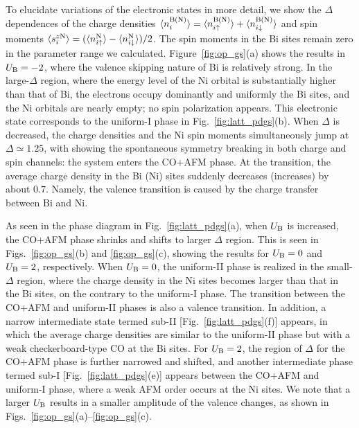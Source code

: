 \documentclass[aps,twocolumn,prl,showpacs,preprintnumbers,amsmath,amssymb]{revtex4}
\begin{document}
To elucidate variations of the electronic states in more detail, we show the $\Delta$ dependences of the charge densities $\langle n^{\rm B(N)}_{i} \rangle = \langle n^{\rm B(N)}_{i \uparrow} \rangle +  \langle n^{\rm B(N)}_{i \downarrow} \rangle$ and spin moments $\langle s_{i}^{z {\rm N}} \rangle = (\langle n^{\rm N}_{i \uparrow} \rangle - \langle n^{\rm N}_{i \downarrow} \rangle)/2$. 
The spin moments in the Bi sites remain zero in the parameter range we calculated. 
Figure~\ref{fig:op_gs}(a) shows the results in $U_{\rm B} = -2$, where the valence skipping nature of Bi is relatively strong. 
In the large-$\Delta$ region, where the energy level of the Ni orbital is substantially higher than that of Bi, 
the electrons occupy dominantly and uniformly the Bi sites, and the Ni orbitals are nearly empty; no spin polarization appears. 
This electronic state corresponds to the uniform-I phase in Fig.~\ref{fig:latt_pdgs}(b). 
When $\Delta$ is decreased, the charge densities and the Ni spin moments simultaneously jump at $\Delta \simeq 1.25$, with showing the spontaneous symmetry breaking in both charge and spin channels: the system enters the CO+AFM phase. 
At the transition, the average charge density in the Bi (Ni) sites suddenly decreases (increases) by about $0.7$. 
Namely, the valence transition is caused by the charge transfer between Bi and Ni. 

As seen in the phase diagram in Fig.~\ref{fig:latt_pdgs}(a), when $U_{\rm B}$ is increased, the CO+AFM phase shrinks and shifts to larger $\Delta$ region. 
This is seen in Figs.~\ref{fig:op_gs}(b) and \ref{fig:op_gs}(c), showing the results for $U_{\rm B} = 0$ and $U_{\rm B} = 2$, respectively. 
When $U_{\rm B} = 0$, the uniform-II phase is realized in the small-$\Delta$ region, where the charge density in the Ni sites becomes larger than that in the Bi sites, on the contrary to the uniform-I phase. 
The transition between the CO+AFM and uniform-II phases is also a valence transition. 
In addition, a narrow intermediate state termed sub-II [Fig.~\ref{fig:latt_pdgs}(f)] appears, in which the average charge densities are similar to the uniform-II phase but with a weak checkerboard-type CO at the Bi sites. 
For $U_{\rm B} = 2$, 
the region of $\Delta$ for the CO+AFM phase is further narrowed and shifted, 
and another intermediate phase termed sub-I [Fig.~\ref{fig:latt_pdgs}(e)] appears between the CO+AFM and uniform-I phase, where a weak AFM order occurs at the Ni sites. 
We note that a larger $U_{\rm B}$ results in a smaller amplitude of the valence changes, as shown in Figs.~\ref{fig:op_gs}(a)--\ref{fig:op_gs}(c). 
\end{document}
